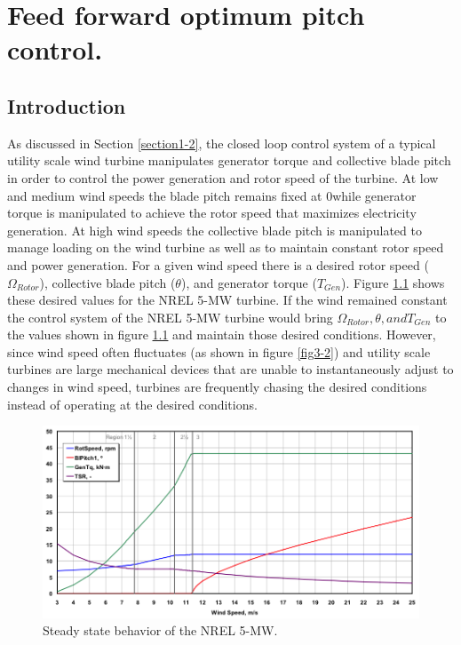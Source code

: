 
\chapter{Feed forward optimum pitch control.} %

\label{Chapter3} %



\section{Introduction} \label{section3-1}
As discussed in Section \ref{section1-2}, the closed loop control system of a typical utility scale wind turbine manipulates generator torque and collective blade pitch in order to control the power generation and rotor speed of the turbine. At low and medium wind speeds the blade pitch remains fixed at 0\degree while generator torque is manipulated to achieve the rotor speed that maximizes electricity generation. At high wind speeds the collective blade pitch is manipulated to manage loading on the wind turbine as well as to maintain constant rotor speed and power generation. For a given wind speed there is a desired rotor speed ($\Omega_{Rotor}$), collective blade pitch ($\theta$), and generator torque ($T_{Gen}$). Figure \ref{fig3-1} shows these desired values for the NREL 5-MW turbine. If the wind remained constant the control system of the NREL 5-MW turbine would bring $\Omega_{Rotor}, \theta, and T_{Gen}$ to the values shown in figure \ref{fig3-1} and maintain those desired conditions. However, since wind speed often fluctuates (as shown in figure \ref{fig3-2}) and utility scale turbines are large mechanical devices that are unable to instantaneously adjust to changes in wind speed, turbines are frequently chasing the desired conditions instead of operating at the desired conditions.

\begin{figure}[htb]
	\centering
		\includegraphics[width=\linewidth]{Figures/ch2Figures/fig2-1.png}
		
	\caption{Steady state behavior of the NREL 5-MW.\cite{jonkman2009}}
	\label{fig3-1}
\end{figure}

